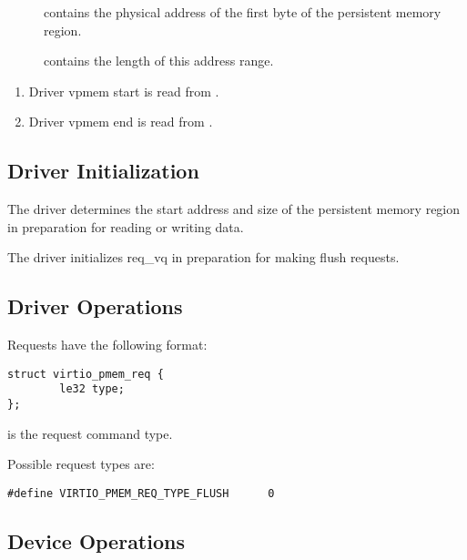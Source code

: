 \begin{description}
\item[] contains the physical address of the first byte of the persistent memory region.

\item[] contains the length of this address range.
\end{description}

\begin{enumerate}
\item Driver vpmem start is read from .
\item Driver vpmem end is read from .
\end{enumerate}

\subsection{Driver Initialization}\label{sec:Device Types / PMEM Driver / Driver Initialization}

The driver determines the start address and size of the persistent memory region in preparation for reading or writing data.

The driver initializes req_vq in preparation for making flush requests.

\subsection{Driver Operations}\label{sec:Device Types / PMEM Driver / Driver Operation / Request Queues}

Requests have the following format:

\begin{lstlisting}
struct virtio_pmem_req {
        le32 type;
};
\end{lstlisting}

 is the request command type.

Possible request types are:

\begin{lstlisting}
#define VIRTIO_PMEM_REQ_TYPE_FLUSH      0
\end{lstlisting}

\subsection{Device Operations}\label{sec:Device Types / PMEM Driver / Device Operation}

